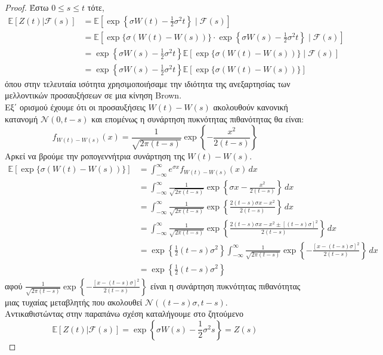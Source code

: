 \documentclass[12pt,a4paper,twoside,openany]{book}
\begin{document}
		\begin{proof}{
			\allowdisplaybreaks
			Έστω $0\leq s\leq t$ τότε,
			\begin{align*}
				\mathbb{E}[Z(t)|\mathcal{F}(s)] &= \mathbb{E}\left[\exp\left\{\sigma W(t)-\frac{1}{2}\sigma^2t\right\} \mid\mathcal{F}(s)\right] \\
				&= \mathbb{E}\left[\exp\{\sigma \left(W(t)-W(s)\right)\} \cdot \exp\left\{\sigma W(s)-\frac{1}{2}\sigma^2t\right\} \mid\mathcal{F}(s) \right] \\
				&= \exp\left\{\sigma W(s)-\frac{1}{2}\sigma^2t\right\} \mathbb{E}\left[\exp\{\sigma \left(W(t)-W(s)\right)\} \mid\mathcal{F}(s) \right] \\
				&= \exp\left\{\sigma W(s)-\frac{1}{2}\sigma^2t\right\} \mathbb{E}\left[\exp\{\sigma \left(W(t)-W(s)\right)\}\right]  
			\end{align*}
			όπου στην τελευταία ισότητα χρησιμοποιήσαμε την ιδιότητα της ανεξαρτησίας των μελλοντικών προσαυξήσεων σε μια κίνηση Brown.\\ Εξ΄ ορισμού έχουμε ότι οι προσαυξήσεις $W(t)-W(s)$ ακολουθούν κανονική κατανομή $\mathcal{N}(0,t-s)$ και επομένως η συνάρτηση πυκνότητας πιθανότητας θα είναι: \[f_{W(t)-W(s)}(x)=\frac{1}{\sqrt{2\pi(t-s)}}\exp\left\{-\frac{x^2}{2(t-s)}\right\}\] 
			Αρκεί να βρούμε την ροπογεννήτρια συνάρτηση της $W(t)-W(s)$.
			\begin{align*}
				\mathbb{E}\left[\exp\{\sigma \left(W(t)-W(s)\right)\}\right] &= \int_{-\infty}^{\infty}e^{\sigma x}f_{W(t)-W(s)}(x)\,dx \\
				&= \int_{-\infty}^{\infty} \frac{1}{\sqrt{2\pi(t-s)}} \exp\left\{\sigma x-\frac{x^2}{2(t-s)}\right\}\,dx \\ 
				&= \int_{-\infty}^{\infty} \frac{1}{\sqrt{2\pi(t-s)}} \exp\left\{\frac{2(t-s)\sigma x-x^2}{2(t-s)}\right\}\,dx \\ 
				&= \int_{-\infty}^{\infty} \frac{1}{\sqrt{2\pi(t-s)}} \exp\left\{\frac{2(t-s)\sigma x-x^2 \pm [(t-s)\sigma]^2}{2(t-s)}\right\}\,dx \\
				&= \exp\left\{\frac{1}{2}(t-s)\sigma^2\right\} \int_{-\infty}^{\infty} \frac{1}{\sqrt{2\pi(t-s)}} \exp\left\{ -\frac{[x-(t-s)\sigma]^2}{2(t-s)} \right\}\,dx \\ 
				&= \exp\left\{\frac{1}{2}(t-s)\sigma^2\right\}
			\end{align*}
			αφού $\frac{1}{\sqrt{2\pi(t-s)}} \exp\left\{ -\frac{[x-(t-s)\sigma]^2}{2(t-s)} \right\}$ είναι η συνάρτηση πυκνότητας πιθανότητας μιας τυχαίας μεταβλητής που ακολουθεί $\mathcal{N}((t-s)\sigma,t-s)$.\\
			Αντικαθιστώντας στην παραπάνω σχέση καταλήγουμε στο ζητούμενο
			\[\mathbb{E}[Z(t)|\mathcal{F}(s)] =\exp\left\{\sigma W(s)-\frac{1}{2}\sigma^2s\right\} = Z(s)  \]
		}
		\end{proof}
	
\end{document}

